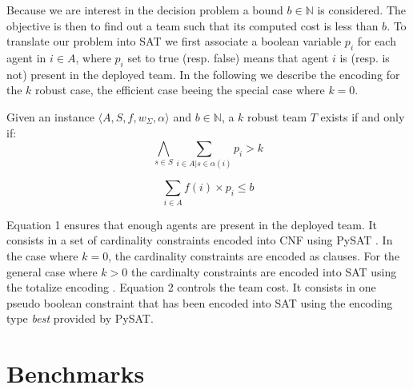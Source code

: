 \documentclass[conference]{IEEEtran}
\theoremstyle{definition}
\begin{document}
Because we are interest in the decision problem a bound $b \in \mathbb{N}$ is considered.
The objective is then to find out a team such that its computed cost is less than $b$.
To translate our problem into SAT we first associate a boolean 
variable $p_i$ for each agent in $i \in A$, where $p_i$ set to true (resp. false)
means that agent $i$ is (resp. is not) present in the deployed team.
In the following we describe the encoding for the $k$ robust case, the efficient
case beeing the special case where $k=0$.

Given an instance $\langle A, S, f, w_\Sigma, \alpha\rangle$ and $b \in \mathbb{N}$, 
a $k$ robust team $T$ exists if and only if:
\begin{equation}
\bigwedge_{s \in S} \sum_{i \in A | s \in \alpha(i)} p_i > k
\end{equation}

\begin{equation}
\sum_{i \in A} f(i) \times p_i \leq b
\end{equation}

Equation 1 ensures that enough agents are present in the deployed team. 
It consists in a set of cardinality constraints encoded into CNF using PySAT \cite{imms-sat18}.
In the case where $k = 0$, the cardinality constraints are encoded as clauses. 
For the general case where $k > 0$ the cardinalty constraints are encoded into SAT using
the totalize encoding \cite{BailleuxB03}.
Equation 2 controls the team cost. It consists in one pseudo boolean constraint
that has been encoded into SAT using the encoding type \textit{best} provided by PySAT.


\section{Benchmarks}




 

\end{document}
